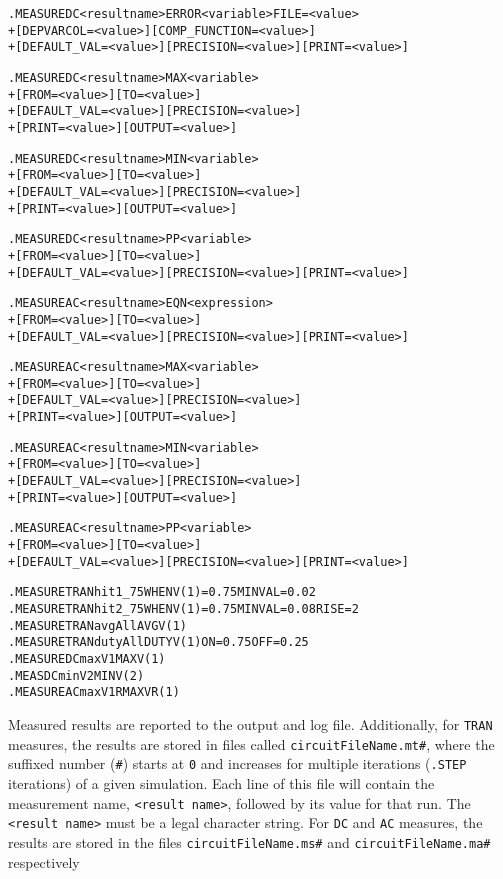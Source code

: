 \begin{Command}
\begin{alltt}
.MEASURE DC <result name> ERROR <variable> FILE=<value>
+ [DEPVARCOL=<value>] [COMP_FUNCTION=<value>]
+ [DEFAULT_VAL=<value>] [PRECISION=<value>] [PRINT=<value>]

.MEASURE DC <result name> MAX <variable>
+ [FROM=<value>] [TO=<value>] 
+ [DEFAULT_VAL=<value>] [PRECISION=<value>] 
+ [PRINT=<value>] [OUTPUT=<value>]

.MEASURE DC <result name> MIN <variable>
+ [FROM=<value>] [TO=<value>] 
+ [DEFAULT_VAL=<value>] [PRECISION=<value>]
+ [PRINT=<value>] [OUTPUT=<value>]

.MEASURE DC <result name> PP <variable>
+ [FROM=<value>] [TO=<value>] 
+ [DEFAULT_VAL=<value>] [PRECISION=<value>] [PRINT=<value>] 

.MEASURE AC <result name> EQN <expression> 
+ [FROM=<value>] [TO=<value>] 
+ [DEFAULT_VAL=<value>] [PRECISION=<value>] [PRINT=<value>]

.MEASURE AC <result name> MAX <variable>
+ [FROM=<value>] [TO=<value>] 
+ [DEFAULT_VAL=<value>] [PRECISION=<value>] 
+ [PRINT=<value>] [OUTPUT=<value>]

.MEASURE AC <result name> MIN <variable>
+ [FROM=<value>] [TO=<value>] 
+ [DEFAULT_VAL=<value>] [PRECISION=<value>]
+ [PRINT=<value>] [OUTPUT=<value>]

.MEASURE AC <result name> PP <variable>
+ [FROM=<value>] [TO=<value>] 
+ [DEFAULT_VAL=<value>] [PRECISION=<value>] [PRINT=<value>]    

\end{alltt}

\examples
\begin{alltt}
.MEASURE TRAN hit1_75 WHEN V(1)=0.75 MINVAL=0.02
.MEASURE TRAN hit2_75 WHEN V(1)=0.75 MINVAL=0.08 RISE=2
.MEASURE TRAN avgAll AVG V(1)
.MEASURE TRAN dutyAll DUTY V(1) ON=0.75 OFF=0.25
.MEASURE DC maxV1 MAX V(1)
.MEAS DC minV2 MIN V(2)
.MEASURE AC maxV1R MAX VR(1)
\end{alltt}

\arguments

\begin{Arguments}

Measured results are reported to the output and log file.
Additionally, for \texttt{TRAN} measures, the results are stored in
files called \texttt{circuitFileName.mt\#}, where the suffixed number
(\texttt{\#}) starts at \texttt{0} and increases for multiple
iterations (\texttt{.STEP} iterations) of a given simulation. Each
line of this file will contain the measurement name, \texttt{<result
name>}, followed by its value for that run.  The \texttt{<result
name>} must be a legal \Xyce{} character string.  For
\texttt{DC} and \texttt{AC} measures, the results are stored in the files 
\texttt{circuitFileName.ms\#} and \texttt{circuitFileName.ma\#} respectively


\end{Arguments}
\end{Command}
